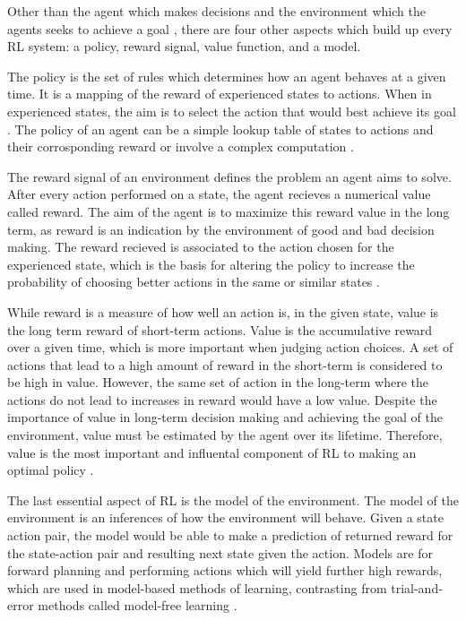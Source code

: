 Other than the agent which makes decisions and the environment which the agents seeks to achieve a goal \cite{Sutton1}, there are four other aspects which build up every RL system: a policy, reward signal, value function, and a model.

The policy is the set of rules which determines how an agent behaves at a given time. It is a mapping of the reward of experienced states to actions. When in experienced states, the aim is to select the action that would best achieve its goal \cite{GabrieleDe}. The policy of an agent can be a simple lookup table of states to actions and their corrosponding reward or involve a complex computation \cite{Sutton1}. 

The reward signal of an environment defines the problem an agent aims to solve. After every action performed on a state, the agent recieves a numerical value called reward. The aim of the agent is to maximize this reward value in the long term, as reward is an indication by the environment of good and bad decision making. The reward recieved is associated to the action chosen for the experienced state, which is the basis for altering the policy to increase the probability of choosing better actions in the same or similar states \cite{Sutton1}. 

While reward is a measure of how well an action is, in the given state, value is the long term reward of short-term actions. Value is the accumulative reward over a given time, which is more important when judging action choices. A set of actions that lead to a high amount of reward in the short-term is considered to be high in value. However, the same set of action in the long-term where the actions do not lead to increases in reward would have a low value. Despite the importance of value in long-term decision making and achieving the goal of the environment, value must be estimated by the agent over its lifetime. Therefore, value is the most important and influental component of RL to making an optimal policy \cite{Sutton1}. 

The last essential aspect of RL is the model of the environment. The model of the environment is an inferences of how the environment will behave. Given a state action pair, the model would be able to make a prediction of returned reward for the state-action pair and resulting next state given the action. Models are for forward planning and performing actions which will yield further high rewards, which are used in model-based methods of learning, contrasting from trial-and-error methods called model-free learning \cite{Sutton1}.

